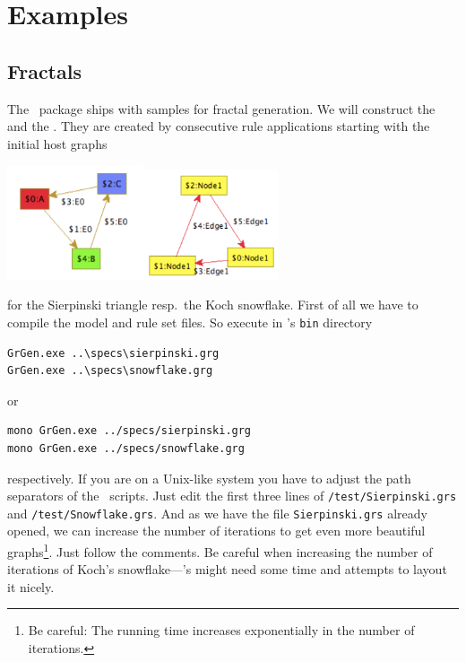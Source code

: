 \chapter{Examples}
\label{anexample}

\section{Fractals}
\label{fractals}
The \GrG\ package ships with samples for fractal generation. We will construct the  and the . They are created by consecutive rule applications starting with the initial host graphs
\begin{center}
\includegraphics[width=4cm]{fig/startsir}\quad\quad\includegraphics[width=4cm]{fig/startkoch}
\end{center}
for the Sierpinski triangle resp.\ the Koch snowflake. 
First of all we have to compile the model and rule set files. So execute in \GrG's \texttt{bin} directory
\begin{verbatim}
GrGen.exe ..\specs\sierpinski.grg
GrGen.exe ..\specs\snowflake.grg
\end{verbatim}
or
\begin{verbatim}
mono GrGen.exe ../specs/sierpinski.grg
mono GrGen.exe ../specs/snowflake.grg
\end{verbatim}
respectively. If you are on a Unix-like system you have to adjust the path separators of the \GrShell\ scripts. Just edit the first three lines of \texttt{/test/Sierpinski.grs} and \texttt{/test/Snowflake.grs}. And as we have the file \texttt{Sierpinski.grs} already opened, we can increase the number of iterations to get even more beautiful graphs\footnote{Be careful: The running time increases exponentially in the number of iterations.}. Just follow the comments. Be careful when increasing the number of iterations of Koch's snowflake---\yComp's  might need some time and attempts to layout it nicely.
